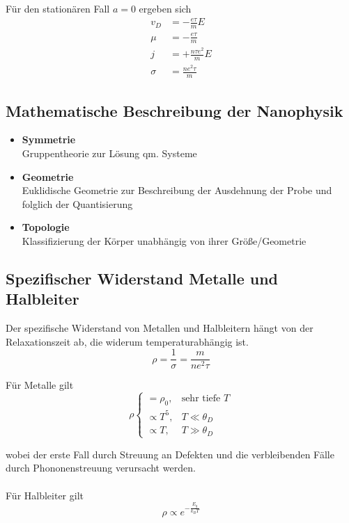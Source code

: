 \documentclass{article}
\begin{document}
Für den stationären Fall $a=0$ ergeben sich 
	\begin{align}
		v_D &= -\frac{e\tau}{m}E\\
		\mu &= -\frac{e\tau}{m}\\
		j &= +\frac{n\tau e^2}{m} E\\
		\sigma &= \frac{ne^2\tau}{m}
	\end{align}


\subsection{Mathematische Beschreibung der Nanophysik}
\begin{itemize}
	\item \textbf{Symmetrie}\\
	Gruppentheorie zur Lösung qm. Systeme
	
	\item \textbf{Geometrie}\\
	Euklidische Geometrie zur Beschreibung der Ausdehnung der Probe und folglich der Quantisierung
	
	\item \textbf{Topologie}\\
	Klassifizierung der Körper unabhängig von ihrer Größe/Geometrie
\end{itemize}


\subsection{Spezifischer Widerstand Metalle und Halbleiter}
Der spezifische Widerstand von Metallen und Halbleitern hängt von der Relaxationszeit ab, die widerum temperaturabhängig ist.
	\begin{equation}
		\rho = \frac{1}{\sigma} = \frac{m}{ne^2\tau}
	\end{equation}



Für Metalle gilt
	\begin{equation}
		\rho
		\begin{cases}
			= \rho_0, & \text{sehr tiefe $T$}\\
			\propto T^5, & T\ll \theta_D\\
			\propto T, & T\gg \theta_D
		\end{cases}		
	\end{equation}

wobei der erste Fall durch Streuung an Defekten und die verbleibenden Fälle durch Phononenstreuung verursacht werden.\\
\\	
Für Halbleiter gilt
	\begin{equation}
		\rho \propto e^{-\frac{E_g}{k_B T}}
	\end{equation}
\end{document}
